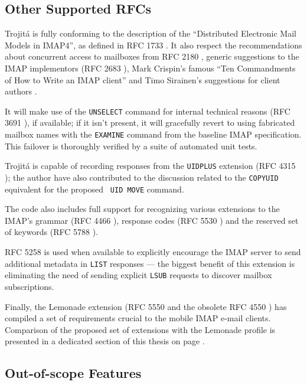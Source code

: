 \documentclass[trojita]{subfiles}
\begin{document}
\subsection{Other Supported RFCs}

Trojitá is fully conforming to the description of the ``Distributed Electronic Mail Models in IMAP4'', as defined in RFC
1733 \cite{rfc1733}.  It also respect the recommendations about concurrent access to mailboxes from RFC 2180
\cite{rfc2180}, generic suggestions to the IMAP implementors (RFC 2683 \cite{rfc2683}), Mark Crispin's famous ``Ten
Commandments of How to Write an IMAP client'' \cite{crispin-ten-commandments} and Timo Sirainen's suggestions for client
authors \cite{tss-client-coding-howto} \cite{imapwiki-client-best-practices}.

It will make use of the {\tt UNSELECT} command for internal technical reasons (RFC 3691 \cite{rfc3691}), if available;
if it isn't present, it will gracefully revert to using fabricated mailbox names with the {\tt EXAMINE} command from the
baseline IMAP specification.  This failover is thoroughly verified by a suite of automated unit tests.

Trojitá is capable of recording responses from the {\tt UIDPLUS} extension (RFC 4315 \cite{rfc4315}); the author have
also contributed \cite{jkt-move-uidplus} to the discussion related to the {\tt COPYUID} equivalent for the proposed {\tt
UID MOVE} command.

The code also includes full support for recognizing various extensions to the IMAP's grammar (RFC 4466 \cite{rfc4466}),
response codes (RFC 5530 \cite{rfc5530}) and the reserved set of keywords (RFC 5788 \cite{rfc5788}).

RFC 5258 \cite{rfc5258} is used when available to explicitly encourage the IMAP server to send additional metadata in
{\tt LIST} responses --- the biggest benefit of this extension is eliminating the need of sending explicit {\tt LSUB}
requests to discover mailbox subscriptions.

Finally, the Lemonade extension (RFC 5550 \cite{rfc5550} and the obsolete RFC 4550 \cite{rfc4550}) has compiled a set of
requirements crucial to the mobile IMAP e-mail clients.  Comparison of the proposed set of extensions with the Lemonade
profile is presented in a dedicated section of this thesis on page \pageref{sec:lemonade-comparison}.

\subsection{Out-of-scope Features}
\end{document}
